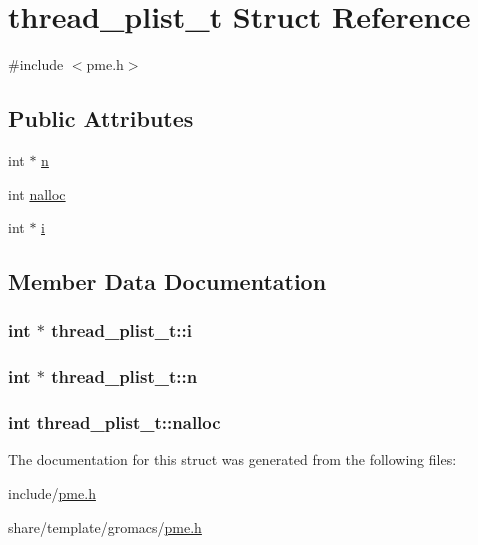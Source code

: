 \hypertarget{structthread__plist__t}{\section{thread\-\_\-plist\-\_\-t \-Struct \-Reference}
\label{structthread__plist__t}
}


{\ttfamily \#include $<$pme.\-h$>$}

\subsection*{\-Public \-Attributes}
\begin{DoxyCompactItemize}
\item 
int $\ast$ \hyperlink{structthread__plist__t_a68b6b5ffd89b40bd6aa90ab1f714f768}{n}
\item 
int \hyperlink{structthread__plist__t_a1f592addc50582eaeef763fd0d3e10f8}{nalloc}
\item 
int $\ast$ \hyperlink{structthread__plist__t_ace03712466a723db4bb82d598e99d026}{i}
\end{DoxyCompactItemize}


\subsection{\-Member \-Data \-Documentation}
\hypertarget{structthread__plist__t_ace03712466a723db4bb82d598e99d026}{
\subsubsection[{i}]{\setlength{\rightskip}{0pt plus 5cm}int $\ast$ {\bf thread\-\_\-plist\-\_\-t\-::i}}}\label{structthread__plist__t_ace03712466a723db4bb82d598e99d026}
\hypertarget{structthread__plist__t_a68b6b5ffd89b40bd6aa90ab1f714f768}{
\subsubsection[{n}]{\setlength{\rightskip}{0pt plus 5cm}int $\ast$ {\bf thread\-\_\-plist\-\_\-t\-::n}}}\label{structthread__plist__t_a68b6b5ffd89b40bd6aa90ab1f714f768}
\hypertarget{structthread__plist__t_a1f592addc50582eaeef763fd0d3e10f8}{
\subsubsection[{nalloc}]{\setlength{\rightskip}{0pt plus 5cm}int {\bf thread\-\_\-plist\-\_\-t\-::nalloc}}}\label{structthread__plist__t_a1f592addc50582eaeef763fd0d3e10f8}


\-The documentation for this struct was generated from the following files\-:\begin{DoxyCompactItemize}
\item 
include/\hyperlink{include_2pme_8h}{pme.\-h}\item 
share/template/gromacs/\hyperlink{share_2template_2gromacs_2pme_8h}{pme.\-h}\end{DoxyCompactItemize}
